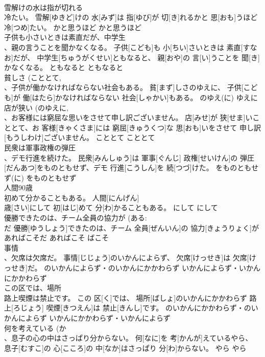 \documentclass[8pt]{extreport}
\begin{document}
\begin{CJK}{UTF8}{min}
\\	雪解けの水は指が切れる 
\\	冷たい。	雪解[ゆきど]けの 水[みず]は 指[ゆび]が 切[き]れるかと 思[おも]うほど 冷[つめ]たい。	かと思うほど	かと思うほど	
\\	子供も小さいときは素直だが、中学生 
\\	、親の言うことを聞かなくなる。	子供[こども]も 小[ちい]さいときは 素直[すなお]だが、 中学生[ちゅうがくせい]ともなると、 親[おや]の 言[い]うことを 聞[き]かなくなる。	ともなると	ともなると	
\\	貧しさ (こととて, 
\\	、子供が働かなければならない社会もある。	貧[まず]しさのゆえに、 子供[こども]が 働[はたら]かなければならない 社会[しゃかい]もある。	のゆえ(に)	ゆえに	
\\	店が狭い (のゆえに, 
\\	、お客様には窮屈な思いをさせて申し訳ございません。	店[みせ]が 狭[せま]いこととて、お 客様[きゃくさま]には 窮屈[きゅうくつ]な 思[おも]いをさせて 申し訳[もうしわけ]ございません。	こととて	こととて	
\\	民衆は軍事政権の弾圧 
\\	、デモ行進を続けた。	民衆[みんしゅう]は 軍事[ぐんじ] 政権[せいけん]の 弾圧[だんあつ]をものともせず、デモ 行進[こうしん]を 続[つづ]けた。	をものともせず(に)	をものともせず	
\\	人間90歳 
\\	初めて分かることもある。	人間[にんげん] 
\\	歳[さい]にして 初[はじ]めて 分[わ]かることもある。	にして	にして	
\\	優勝できたのは、チーム全員の協力が (ある: 
\\	だ	優勝[ゆうしょう]できたのは、チーム 全員[ぜんいん]の 協力[きょうりょく]があればこそだ	あればこそ	ばこそ	
\\	事情 
\\	、欠席は欠席だ。	事情[じじょう]のいかんによらず、 欠席[けっせき]は 欠席[けっせき]だ。	のいかんによらず・のいかんにかかわらず	いかんによらず・いかんにかかわらず	
\\	この区では、場所 
\\	路上喫煙は禁止です。	この 区[く]では、 場所[ばしょ]のいかんにかかわらず 路上[ろじょう] 喫煙[きつえん]は 禁止[きんし]です。	のいかんにかかわらず・のいかんによらず	いかんにかかわらず・いかんによらず	
\\	何を考えている (か 
\\	、息子の心の中はさっぱり分からない。	何[なに]を 考[かんが]えているやら、 息子[むすこ]の 心[こころ]の 中[なか]はさっぱり 分[わ]からない。	やら	やら	

\end{CJK}
\end{document}
